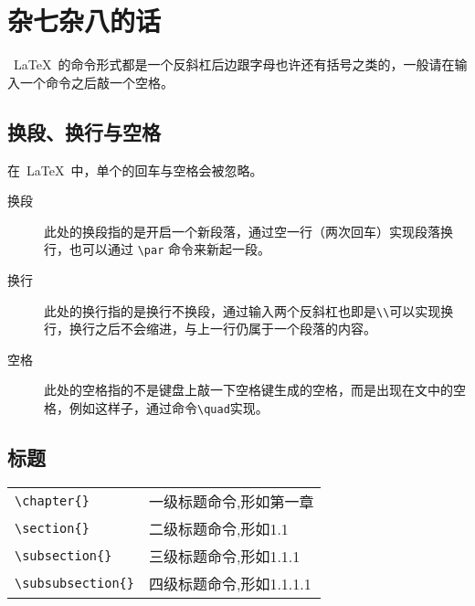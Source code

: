 \chapter{杂七杂八的话}

~\LaTeX~的命令形式都是一个反斜杠后边跟字母也许还有括号之类的，一般请在输入一个命令之后敲一个空格。

\section{换段、换行与空格}
在~\LaTeX~中，单个的回车与空格会被忽略。
\begin{description}
 \item[换段]此处的换段指的是开启一个新段落，通过空一行（两次回车）实现段落换行，也可以通过 \verb|\par| 命令来新起一段。
 \item[换行]此处的换行指的是换行不换段，通过输入两个反斜杠也即是\verb|\\|可以实现换行，换行之后不会缩进，与上一行仍属于一个段落的内容。
 \item[空格]此处的空格指的不是键盘上敲一下空格键生成的空格，而是出现在文中的空格，例如\quad 这\quad 样\quad 子，通过命令\verb|\quad|实现。
\end{description}

\section{标题}
\begin{tabular}{l l}
\verb|\chapter{}| & 一级标题命令,形如第一章 \\
\verb|\section{}| & 二级标题命令,形如1.1 \\
\verb|\subsection{}| & 三级标题命令,形如1.1.1 \\
\verb|\subsubsection{}| & 四级标题命令,形如1.1.1.1 \\
\end{tabular}

